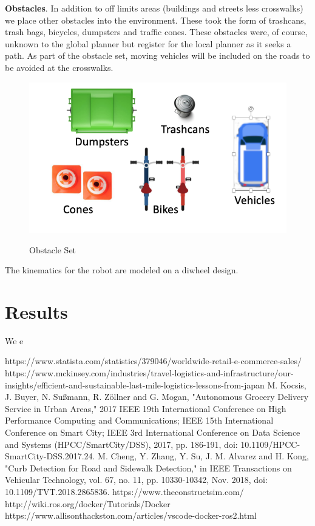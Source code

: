 \documentclass{article}
\begin{document}
\begin{multicols}{2}
\noindent \textbf{Obstacles}. In addition to off limits areas (buildings and streets less crosswalks) we place other obstacles into the environment.  These took the form of trashcans, trash bags, bicycles, dumpsters and traffic cones.  These obstacles were, of course, unknown to the global planner but register for the local planner as it seeks a path.  As part of the obstacle set, moving vehicles will be included on the roads to be avoided at the crosswalks.
\begin{figure}[H]
   \centering
    \includegraphics[width = 1\columnwidth]{figures/obstacles.png}
     \label{fig:obstacles}
     \caption{Obstacle Set}
\end{figure}



The kinematics for the robot are modeled on a diwheel design.
\section*{Results}
We e


\label{References}


\begin{thebibliography}{10}
 https://www.statista.com/statistics/379046/worldwide-retail-e-commerce-sales/
https://www.mckinsey.com/industries/travel-logistics-and-infrastructure/our-insights/efficient-and-sustainable-last-mile-logistics-lessons-from-japan
M. Kocsis, J. Buyer, N. Sußmann, R. Zöllner and G. Mogan, "Autonomous Grocery Delivery Service in Urban Areas," 2017 IEEE 19th International Conference on High Performance Computing and Communications; IEEE 15th International Conference on Smart City; IEEE 3rd International Conference on Data Science and Systems (HPCC/SmartCity/DSS), 2017, pp. 186-191, doi: 10.1109/HPCC-SmartCity-DSS.2017.24.
M. Cheng, Y. Zhang, Y. Su, J. M. Alvarez and H. Kong, "Curb Detection for Road and Sidewalk Detection," in IEEE Transactions on Vehicular Technology, vol. 67, no. 11, pp. 10330-10342, Nov. 2018, doi: 10.1109/TVT.2018.2865836.
 https://www.theconstructsim.com/
 http://wiki.ros.org/docker/Tutorials/Docker
 https://www.allisonthackston.com/articles/vscode-docker-ros2.html




\end{thebibliography}
\end{multicols}
\end{document}
